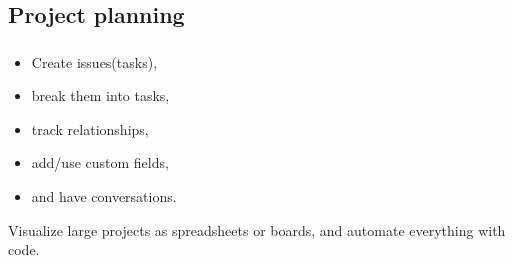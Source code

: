 \subsection{Project planning}
\begin{frame}
  \frametitle{\insertsectionhead}
  \framesubtitle{\insertsubsectionhead}
  \begin{itemize}
      \item Create issues(tasks), 
      \item break them into tasks, 
      \item track relationships, 
      \item add/use custom fields, 
      \item and have conversations. 
  \end{itemize}
  \alert{Visualize large projects as spreadsheets or boards, and automate everything with code.}
\end{frame}
